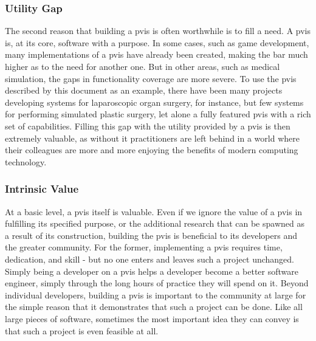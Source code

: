 \subsubsection{Utility Gap}

The second reason that building a \gls{pvis} is often worthwhile is to
fill a need. A \gls{pvis} is, at its core, software with a purpose. In
some cases, such as game development, many implementations of a
\gls{pvis} have already been created, making the bar much higher as to
the need for another one. But in other areas, such as medical
simulation, the gaps in functionality coverage are more severe. To use
the \gls{pvis} described by this document as an example, there have
been many projects developing systems for laparoscopic organ surgery,
for instance, but few systems for performing simulated plastic
surgery, let alone a fully featured \gls{pvis} with a rich set of
capabilities. Filling this gap with the utility provided by a
\gls{pvis} is then extremely valuable, as without it practitioners are
left behind in a world where their colleagues are more and more
enjoying the benefits of modern computing technology.

\subsubsection{Intrinsic Value}

At a basic level, a \gls{pvis} itself is valuable. Even if we ignore the
value of a \gls{pvis} in fulfilling its specified purpose, or the additional
research that can be spawned as a result of its construction, building
the \gls{pvis} is beneficial to its developers and the greater
community. For the former, implementing a \gls{pvis} requires time,
dedication, and skill - but no one enters and leaves such a project
unchanged. Simply being a developer on a \gls{pvis} helps a developer become
a better software engineer, simply through the long hours of practice
they will spend on it. Beyond individual developers, building a \gls{pvis}
is important to the community at large for the simple reason that it
demonstrates that such a project can be done. Like all large pieces of
software, sometimes the most important idea they can convey is that such a project is
even feasible at all.

